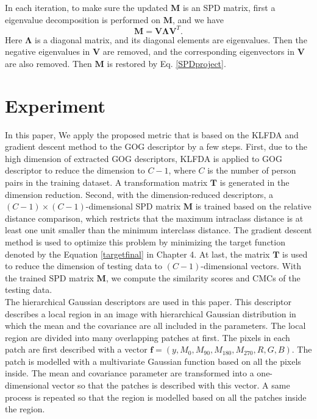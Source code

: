 \documentclass[10pt,twocolumn,letterpaper]{article}
\begin{document}
In each iteration, to make sure the updated $\bm{M}$ is an SPD matrix, first a eigenvalue decomposition is performed on $\bm{M}$, and we have
\begin{equation}\label{SPDproject}
\bm{M} = \bm{V}\bm{\Lambda}\bm{V}^T.
\end{equation}
Here $\bm{\Lambda}$ is a diagonal matrix, and its diagonal elements are eigenvalues. Then the negative eigenvalues in $\bm{V}$ are removed, and the corresponding eigenvectors in $\bm{V}$ are also removed. Then $\bm{M}$ is restored by Eq. \eqref{SPDproject}.
 

\section{Experiment}
In this paper, We apply the proposed metric that is based on the KLFDA and gradient descent method to the GOG descriptor by a few steps. First, due to the high dimension of extracted GOG descriptors, KLFDA is applied to GOG descriptor to reduce the dimension to $C-1$, where $C$ is the number of person pairs in the training dataset. A transformation matrix $\bm{T}$ is generated in the dimension reduction. Second, with the dimension-reduced descriptors, a $(C-1) \times (C-1)$-dimensional SPD matrix $\bm{M}$ is trained based on the relative distance comparison, which restricts that the maximum intraclass distance is at least one unit smaller than the minimum interclass distance. The gradient descent method is used to optimize this problem by minimizing the target function denoted by the Equation \ref{targetfinal} in Chapter 4. At last, the matrix $\bm{T}$ is used to reduce the dimension of testing data to $(C-1)$-dimensional vectors. With the trained SPD matrix $\bm{M}$, we compute the similarity scores and CMCs of the testing data.\\
\indent The hierarchical Gaussian descriptors \cite{GOG} are used in this paper. This descriptor describes a local region in an image with hierarchical Gaussian distribution in which the mean and the covariance are all included in the parameters. The local region are divided into many overlapping patches at first. The pixels in each patch are first described with a vector $\bm{f} = (y, M_0,M_{90},M_{180},M_{270}, R, G, B)$. The patch is modelled with a multivariate Gaussian function based on all the pixels inside. The mean and covariance parameter are transformed into a one-dimensional vector so that the patches is described with this vector. A same process is repeated so that the region is modelled based on all the patches inside the region.
\end{document}
